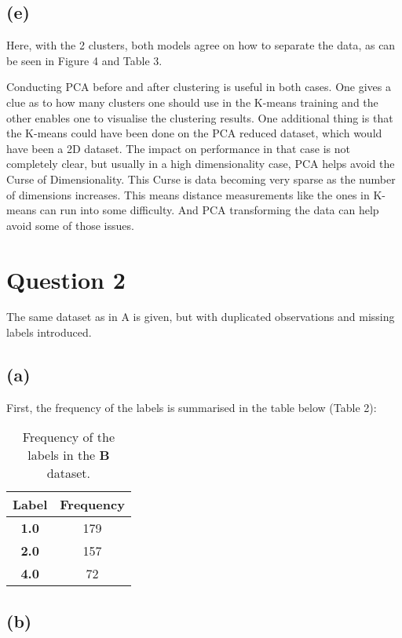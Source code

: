 \documentclass[12pt]{report} %
\begin{document}
\subsection*{(e)}

Here, with the 2 clusters, both models agree on how to separate the data, as can be seen in Figure 4 and Table 3. 

Conducting PCA before and after clustering is useful in both cases. One gives a clue as to how many clusters one should use in the K-means training and the other enables one to visualise the clustering results. One additional thing is that the K-means could have been done on the PCA reduced dataset, which would have been a 2D dataset. The impact on performance in that case is not completely clear, but usually in a high dimensionality case, PCA helps avoid the Curse of Dimensionality. This Curse is data becoming very sparse as the number of dimensions increases\cite[p. 217]{sklearn_book}. This means distance measurements like the ones in K-means can run into some difficulty. And PCA transforming the data can help avoid some of those issues.

\newpage

\section*{Question 2}

The same dataset as in A is given, but with duplicated observations and missing labels introduced.

\subsection*{(a)}

First, the frequency of the labels is summarised in the table below (Table 2):

\begin{table}[h]
\centering
\begin{tabular}{ |c|c| }
    \hline
    \textbf{Label} & \textbf{Frequency} \\
    \hline
    \textbf{1.0} & 179 \\ 
    \hline
    \textbf{2.0} & 157 \\
    \hline
    \textbf{4.0} & 72 \\
    \hline
\end{tabular}
\caption{Frequency of the labels in the \textbf{B} dataset.}
\end{table}

\subsection*{(b)}
\end{document}
